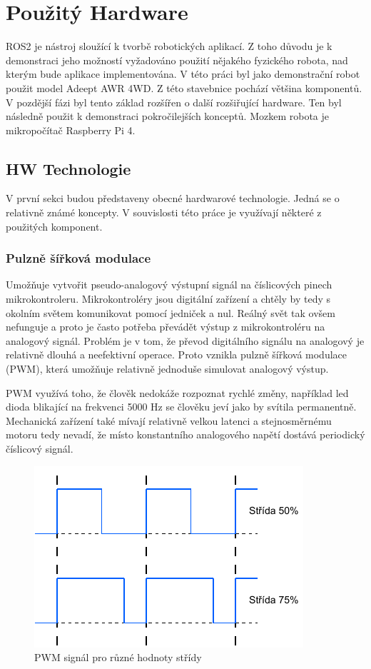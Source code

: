 \chapter{Použitý Hardware}
ROS2 je nástroj sloužící k tvorbě robotických aplikací. Z toho důvodu je k demonstraci jeho možností vyžadováno použití nějakého fyzického robota, nad kterým bude aplikace implementována. V této práci byl jako demonstrační robot použit model Adeept AWR 4WD. Z této stavebnice pochází většina komponentů. V pozdější fázi byl tento základ rozšířen o další rozšiřující hardware. Ten byl následně použit k demonstraci pokročilejších konceptů. Mozkem robota je mikropočítač Raspberry Pi 4.

\section{HW Technologie}
V první sekci budou představeny obecné hardwarové technologie. Jedná se o relativně známé koncepty. V souvislosti této práce je využívají některé z použitých komponent.

\subsection*{Pulzně šířková modulace} 
Umožňuje vytvořit pseudo-analogový výstupní signál na číslicových pinech mikrokontroleru. Mikrokontroléry jsou digitální zařízení a chtěly by tedy s okolním světem komunikovat pomocí jedniček a nul. Reálný svět tak ovšem nefunguje a proto je často potřeba převádět výstup z mikrokontroléru na analogový signál. Problém je v tom, že převod digitálního signálu na analogový je relativně dlouhá a neefektivní operace. Proto vznikla pulzně šířková modulace (PWM), která umožňuje relativně jednoduše simulovat analogový výstup.

PWM využívá toho, že člověk nedokáže rozpoznat rychlé změny, například led dioda blikající na frekvenci 5000 Hz se člověku jeví jako by svítila permanentně. Mechanická zařízení také mívají relativně velkou latenci a stejnosměrnému motoru tedy nevadí, že místo konstantního analogového napětí dostává periodický číslicový signál.

\begin{figure}[h!]
	\centering
	\includegraphics[scale=1.2]{obrazky-figures/pwm_duty_cycle.pdf}
	\caption{PWM signál pro různé hodnoty střídy}
	\label{fig:pwm}
\end{figure}

